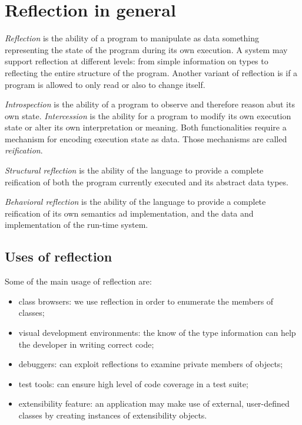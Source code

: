 \section{Reflection in general}
\emph{Reflection} is the ability of a program to manipulate as data something representing the state of the program during its own execution.
A system may support reflection at different levels: from simple information on types to reflecting the entire structure of the program.
Another variant of reflection is if a program is allowed to only read or also to change itself.

\emph{Introspection} is the ability of a program to observe and therefore reason abut its own state.
\emph{Intercession} is the ability for a program to modify its own execution state or alter its own interpretation or meaning.
Both functionalities require a mechanism for encoding execution state as data.
Those mechanisms are called \emph{reification}.

\emph{Structural reflection} is the ability of the language to provide a complete reification of both the program currently executed and its abstract data types.

\emph{Behavioral reflection} is the ability of the language to provide a complete reification of its own semantics ad implementation, and the data and implementation of the run-time system.

\subsection{Uses of reflection}
Some of the main usage of reflection are:
\begin{itemize}
    \item class browsers: we use reflection in order to enumerate the members of classes;
    \item visual development environments: the know of the type information can help the developer in writing correct code;
    \item debuggers: can exploit reflections to examine private members of objects;
    \item test tools: can ensure high level of code coverage in a test suite;
    \item extensibility feature: an application may make use of external, user-defined classes by creating instances of extensibility objects.
\end{itemize}

